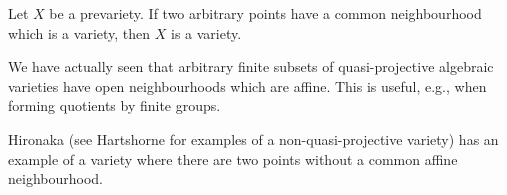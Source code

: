 \documentclass[a4paper,parskip=half,numbers=enddot, DIV=12]{scrreprt}
\begin{document}
    \begin{rem*}
        \begin{alphanumerate}
          \item 
            Let $X$ be a prevariety. If two arbitrary points have a common neighbourhood which is a variety, then $X$ is a variety.
          \item 
            We have actually seen that arbitrary finite subsets of quasi-projective algebraic varieties have open neighbourhoods which are affine. This is useful, e.g., when forming quotients by finite groups.
          \item
            Hironaka (see Hartshorne for examples of a non-quasi-projective variety) has an example of a variety where there are two points without a common affine neighbourhood.
        \end{alphanumerate}
        
    \end{rem*}
\end{document}
